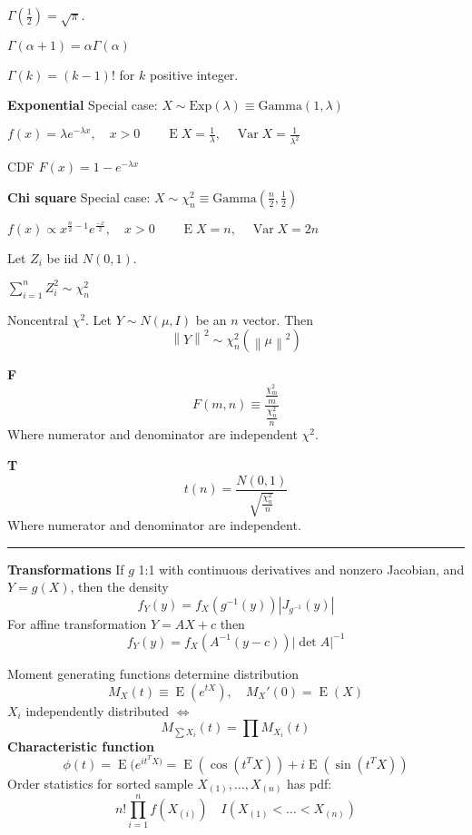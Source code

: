 \documentclass[10pt, twocolumn]{article}
\newcommand{\norm}[1]{\left\lVert#1\right\rVert}
\newcommand{\Expect}{\operatorname{E}}
\newcommand{\Var}{\operatorname{Var}}
\begin{document}
$\Gamma(\frac{1}{2}) = \sqrt{\pi}$.

$\Gamma(\alpha + 1) = \alpha \Gamma(\alpha)$

$\Gamma(k) = (k-1)!$ for $k$ positive integer.

\textbf{Exponential}
Special case: $X \sim \text{Exp}(\lambda) \equiv \text{Gamma}(1, \lambda)$

$
f(x) = \lambda e^{-\lambda x},
\quad x > 0
\qquad \Expect X = \frac{1}{\lambda},
\quad \Var X = \frac{1}{\lambda ^2}
$

CDF $F(x) = 1 - e^{-\lambda x}$

\textbf{Chi square}
Special case: $X \sim \chi^2_n \equiv \text{Gamma}(\frac{n}{2}, \frac{1}{2})$

$
f(x) \propto x^{\frac{n}{2} - 1} e^{\frac{-x}{2}},
\quad x > 0
\qquad \Expect X = n,
\quad \Var X = 2n
$

Let $Z_i$ be iid $N(0, 1)$.

$\sum_{i=1}^n Z_i^2 \sim \chi^2_n$

Noncentral $\chi^2$. Let $Y \sim N(\mu, I)$ be an $n$ vector. Then 
\[
    \norm{Y}^2 \sim \chi^2_n(\norm{\mu}^2)
\]

\textbf{F}
\[
    F(m, n) \equiv \frac{\frac{\chi^2_m}{m}}
        {\frac{\chi^2_n}{n}}
\]
Where numerator and denominator are independent $\chi^2$.

\textbf{T}
\[
    t(n) = \frac{N(0, 1)}
    {\sqrt{\frac{\chi^2_n}{n}}}
\]
Where numerator and denominator are independent.

\vspace{0.2in}
\hrule

\textbf{Transformations} If $g$ 1:1 with continuous derivatives and nonzero
Jacobian, and $Y = g(X)$, then the density
\[
    f_Y(y) = f_X(g^{-1}(y)) |J_{g^{-1}}(y)|
\]
For affine transformation $Y = AX + c$ then 
\[
    f_Y(y) = f_X(A^{-1}(y - c)) |\det A|^{-1}
\]

Moment generating functions determine distribution
\[
    M_X(t) \equiv \Expect (e^{tX}),
    \quad M_X'(0) = \Expect(X)
\]
$X_i$ independently distributed $\iff$
\[
    M_{\sum X_i} (t) = \prod M_{X_i} (t)
\]
\textbf{Characteristic function}
\[
    \phi(t) = \Expect (e^{i t^T X)}
    = \Expect (\cos (t^T X)) + i \Expect(\sin(t^T X))
\]
Order statistics for sorted sample $X_{(1)}, \dots, X_{(n)}$ has pdf:
\[
    n! \prod_{i=1}^n f(X_{(i)}) \quad I(X_{(1)} < \dots < X_{(n)})
\]

\newpage
\end{document}
